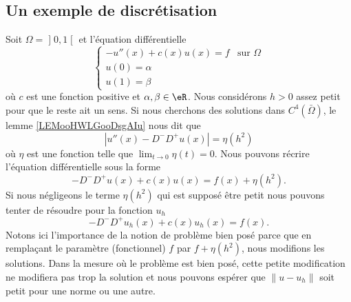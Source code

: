 \subsection{Un exemple de discrétisation}

Soit \( \Omega=\mathopen] 0 , 1 \mathclose[\) et l'équation différentielle
\begin{equation}
     \begin{cases}
         -u''(x)+c(x)u(x)=f    &   \text{sur } \Omega\\
         u(0)=\alpha\\
         u(1)=\beta
     \end{cases}
\end{equation}
où \( c\) est une fonction positive et \( \alpha,\beta\in \eR\). Nous considérons \( h>0\) assez petit pour que le reste ait un sens. Si nous cherchons des solutions dans \( C^4(\bar\Omega)\), le lemme \ref{LEMooHWLGooDsgAIu} nous dit que 
\begin{equation}
    | u''(x)-D^-D^+u(x) |=\eta(h^2)
\end{equation}
où \( \eta\) est une fonction telle que \( \lim_{t\to 0} \eta(t)=0\). Nous pouvons récrire l'équation différentielle sous la forme
\begin{equation}
    -D^-D^+u(x)+c(x)u(x)=f(x)+\eta(h^2).
\end{equation}
Si nous négligeons le terme \( \eta(h^2)\) qui est supposé être petit nous pouvons tenter de résoudre pour la fonction \( u_h\)
\begin{equation}
    -D^-D^+u_h(x)+c(x)u_h(x)=f(x).
\end{equation}
Notons ici l'importance de la notion de problème bien posé parce que en remplaçant le paramètre (fonctionnel) \( f\) par \( f+\eta(h^2)\), nous modifions les solutions. Dans la mesure où le problème est bien posé, cette petite modification ne modifiera pas trop la solution et nous pouvons espérer que \( \| u-u_h \|\) soit petit pour une norme ou une autre.

